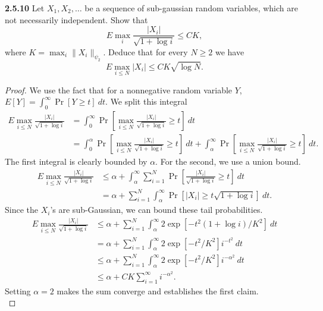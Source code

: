 \documentclass[11pt,letterpaper]{report}
\newcommand{\subg}[1]{\|{#1}\|_{\psi_2}}
\begin{document}
\noindent\textbf{2.5.10}
Let $X_1, X_2, \ldots$ be a sequence of sub-gaussian random variables, which are not necessarily independent. Show that
\[
E\max_i \frac{|X_i|}{\sqrt{1+\log i}}\leq CK,
\]
where $K = \max_i\subg{X_i}$. Deduce that for every $N\geq 2$ we have
\[
E\max_{i\leq N}|X_i|\leq CK\sqrt{\log N}.
\]
\begin{proof}
	We use the fact that for a nonnegative random variable $Y$, $E[Y] = \int_0^\infty \Pr[Y\geq t]\ dt$. We split this integral
	\begin{align*}
		E\max_{i\leq N} \frac{|X_i|}{\sqrt{1+\log i}} &= \int_0^\infty\Pr\left[\max_{i\leq N}\frac{|X_i|}{\sqrt{1+\log i}} \geq t \right]\ dt\\
		&= \int_0^\alpha\Pr\left[\max_{i\leq N}\frac{|X_i|}{\sqrt{1+\log i}} \geq t \right]\ dt + \int_\alpha^\infty\Pr\left[\max_{i\leq N}\frac{|X_i|}{\sqrt{1+\log i}} \geq t \right]\ dt.
	\end{align*}
	The first integral is clearly bounded by $\alpha$. For the second, we use a union bound.
	\begin{align*}
		E\max_{i\leq N} \frac{|X_i|}{\sqrt{1+\log i}} &\leq \alpha + \int_\alpha^\infty \sum_{i=1}^N\Pr\left[\frac{|X_i|}{\sqrt{1+\log i}} \geq t \right]\ dt\\
		&= \alpha + \sum_{i=1}^N\int_\alpha^\infty \Pr[|X_i|\geq t\sqrt{1+\log i}]\ dt.
	\end{align*}
	Since the $X_i$'s are sub-Gaussian, we can bound these tail probabilities.
	\begin{align*}
		E\max_{i\leq N} \frac{|X_i|}{\sqrt{1+\log i}} &\leq\alpha + \sum_{i=1}^N\int_\alpha^\infty 2\exp\left[-t^2(1+\log i)/K^2 \right]\ dt\\
		&= \alpha + \sum_{i=1}^N\int_\alpha^\infty 2\exp\left[-t^2/K^2 \right]i^{-t^2}\ dt\\
		&\leq  \alpha + \sum_{i=1}^N\int_\alpha^\infty 2\exp\left[-t^2/K^2 \right]i^{-\alpha^2}\ dt\\
		&\leq \alpha + CK\sum_{i=1}^\infty i^{-\alpha^2}.
	\end{align*}
	Setting $\alpha= 2$ makes the sum converge and establishes the first claim.\\
\end{proof}
\end{document}
